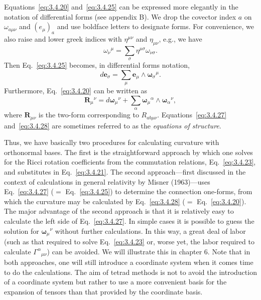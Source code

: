Equations~\eqref{eq:3.4.20} and~\eqref{eq:3.4.25} can be expressed more elegantly in the notation
of differential forms (see appendix B). We drop the covector index $a$ on $\omega_{a\mu\nu}$
and $(e_\mu)_a$ and use boldface letters to designate forms. For convenience, we also raise and
lower greek indices with $\eta^{\mu\nu}$ and $\eta_{\mu\nu}$, e.g., we have
\begin{equation}
  \omega_\nu{}^\mu=\sum_\sigma\eta^{\mu\sigma}\omega_{\nu\sigma}.
  \tag{3.4.26}\label{eq:3.4.26}
\end{equation}
Then Eq.~\eqref{eq:3.4.25} becomes, in differential forms notation,
\begin{equation}
  d\boldsymbol{e}_\sigma
  =\sum_\mu\boldsymbol{e}_\mu\wedge\boldsymbol{\omega}_\sigma{}^\mu.
  \tag{3.4.27}\label{eq:3.4.27}
\end{equation}
Furthermore, Eq.~\eqref{eq:3.4.20} can be written as
\begin{equation}
  \boldsymbol{R}_\mu{}^\nu
  =d\boldsymbol{\omega}_\mu{}^\nu
  +\sum_\alpha\boldsymbol{\omega}_\mu{}^\alpha\wedge\boldsymbol{\omega}_\alpha{}^\nu,
  \tag{3.4.28}\label{eq:3.4.28}
\end{equation}
where $\boldsymbol{R}_{\mu\nu}$ is the two-form corresponding to $R_{ab\mu\nu}$. Equations~\eqref{eq:3.4.27}
and~\eqref{eq:3.4.28} are sometimes referred to as the \emph{equations of structure}.

Thus, we have basically two procedures for calculating curvature with orthonormal bases. The first is the straightforward approach by which one solves for the
Ricci rotation coefficients from the commutation relations, Eq.~\eqref{eq:3.4.23}, and
substitutes in Eq.~\eqref{eq:3.4.21}. The second approach---first discussed in the context
of calculations in general relativity by Misner (1963)---uses Eq.~\eqref{eq:3.4.27}
($=$ Eq.~\eqref{eq:3.4.25}) to determine the connection one-forms, from which the curvature may be
calculated by Eq.~\eqref{eq:3.4.28} ($=$ Eq.~\eqref{eq:3.4.20}). The major advantage of the second
approach is that it is relatively easy to calculate the left side of Eq.~\eqref{eq:3.4.27}. In
simple cases it is possible to guess the solution for $\boldsymbol{\omega}_\mu{}^\nu$ without further calculations.
In this way, a great deal of labor (such as that required to solve Eq.~\eqref{eq:3.4.23} or, worse
yet, the labor required to calculate $\Gamma^\alpha{}_{\mu\nu}$) can be avoided. We will illustrate this in
chapter 6. Note that in both approaches, one will still introduce a coordinate system
when it comes time to do the calculations. The aim of tetrad methods is not to avoid
the introduction of a coordinate system but rather to use a more convenient basis for
the expansion of tensors than that provided by the coordinate basis.

